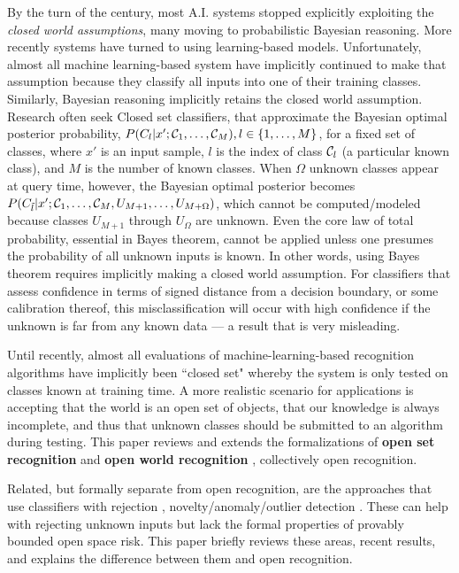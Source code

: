 \documentclass[letterpaper]{article}
\begin{document}
By the turn of the century, most A.I. systems stopped explicitly
exploiting the {\em closed world assumptions}, many moving to
probabilistic Bayesian reasoning.
More recently systems have turned to using learning-based models.
Unfortunately, almost all machine learning-based system have
implicitly continued to make that assumption because they classify all inputs into one of their training classes.
Similarly, Bayesian reasoning implicitly retains the closed world
assumption.
Research often seek Closed set classifiers, that approximate the Bayesian
optimal posterior probability, $P(C_l |x';{\cal C}_1, 
\hdots, {\cal C}_M), l \in \{1,\hdots, M\}$, for a fixed set of
classes, where $x'$ is an input sample, $l$ is the index of class
${\cal C}_l$ (a particular known class), and $M$ is the number of
known classes.
When $\Omega$ unknown classes appear at query time, however, the
Bayesian optimal posterior becomes $P(C_{\tilde{l}} |x';{\cal C}_1,
 \hdots, {\cal C}_M, U_{M+1}, \hdots, U_{M+\Omega})$, which cannot be
computed/modeled because classes $U_{M+1}$ through $U_\Omega$ are
unknown.
Even the core law of total probability, essential in Bayes theorem,
cannot be applied unless one presumes the probability of all unknown
inputs is known.
In other words, using Bayes theorem requires implicitly making a
closed world assumption.
For classifiers that assess confidence in terms of signed distance from a decision boundary, or some calibration thereof, this misclassification will occur with high confidence if the unknown is far from any known data --- a result that is very misleading.

Until recently, almost all evaluations of machine-learning-based recognition algorithms have implicitly been  ``closed set" whereby the system is only tested on classes known at training time. A more realistic scenario for applications is accepting that the world is an open set of objects, that our knowledge is always incomplete, and thus that unknown classes should be submitted to an algorithm during testing.  This paper reviews and extends the formalizations of {\bf open set recognition}  \cite{Walter_openset,walter2014} and   \textbf{open world recognition}  \cite{bendale2015towards}, collectively open recognition.

Related, but formally separate from open recognition, are the approaches that use classifiers with rejection  \cite{chow1970optimum,matan1990handwritten,fumera2002support,zhang2006ro,bartlett2008classification,Grandvalet_nips08_reject}, novelty/anomaly/outlier detection  \cite{hodge2004survey,markou2003novelty}.  These can help with rejecting unknown inputs but lack the formal properties of provably bounded open space risk.   This paper briefly reviews these areas, recent results,  and explains the difference between them and open recognition. 
\end{document}
